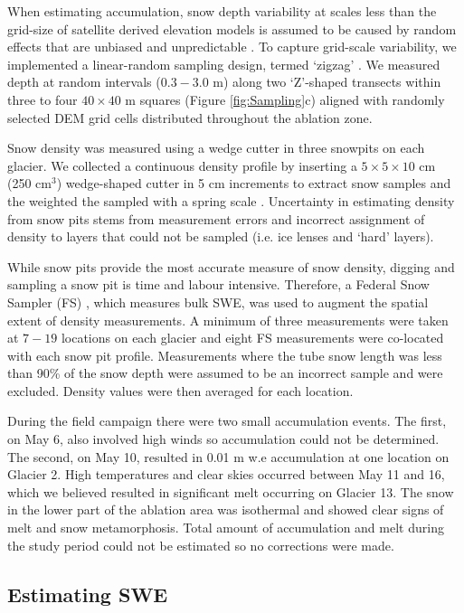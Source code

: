 \documentclass[twocolumn,letterpaper]{igs}
\begin{document}
When estimating accumulation, snow depth variability at scales less than the grid-size of satellite derived elevation models is assumed to be caused by random effects that are unbiased and unpredictable \citep{Watson2006}. To capture grid-scale variability, we implemented a linear-random sampling design, termed `zigzag' \citep{Shea2010}. We measured depth at random intervals ($0.3 - 3.0$ m) along two `Z'-shaped transects within three to four $40\times40$ m squares (Figure \ref{fig:Sampling}c) aligned with randomly selected DEM grid cells distributed throughout the ablation zone.

Snow density was measured using a wedge cutter in three snowpits on each glacier. We collected a continuous density profile by inserting a $5\times5\times 10$ cm (250 cm$^3$) wedge-shaped cutter in 5 cm increments to extract snow samples and the weighted the sampled with a spring scale \citep[e.g.][]{Gray1981,Fierz2009}. Uncertainty in estimating density from snow pits stems from measurement errors and incorrect assignment of density to layers that could not be sampled (i.e. ice lenses and `hard' layers). 

While snow pits provide the most accurate measure of snow density, digging and sampling a snow pit is time and labour intensive. Therefore, a Federal Snow Sampler (FS) \citep{Clyde1932}, which measures bulk SWE, was used to augment the spatial extent of density measurements. A minimum of three measurements were taken at $7-19$ locations on each glacier and eight FS measurements were co-located with each snow pit profile. Measurements where the tube snow length was less than 90\% of the snow depth were assumed to be an incorrect sample and were excluded. Density values were then averaged for each location. 

During the field campaign there were two small accumulation events. The first, on May 6, also involved high winds so accumulation could not be determined. The second, on May 10, resulted in 0.01 m w.e accumulation at one location on Glacier 2. High temperatures and clear skies occurred between May 11 and 16, which we believed resulted in significant melt occurring on Glacier 13. The snow in the lower part of the ablation area was isothermal and showed clear signs of melt and snow metamorphosis. Total amount of accumulation and melt during the study period could not be estimated so no corrections were made. 

\subsection{Estimating SWE}
\end{document}
